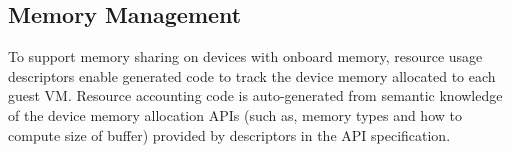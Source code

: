 
\subsection{Memory Management}

To support memory sharing on devices with onboard memory, \Lapis resource usage descriptors
enable generated code to track the device memory
allocated to each guest VM. %
Resource accounting code is auto-generated from semantic knowledge of
the device memory allocation APIs (such as, memory types and how to compute size
of buffer) provided by descriptors in the API specification.
